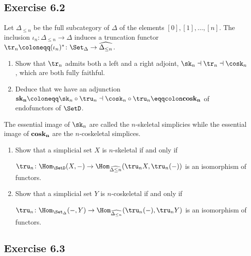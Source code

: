 \subsection{ Exercise 6.2 }

Let $ \Delta_{ \leq n } $ be the full subcategory of $ \Delta $ of the elements $ [ 0 ] , [ 1 ] , \dotsc , [ n ] $.
The inclusion $ \iota_n \colon \Delta_ { \leq n } \to \Delta $ induces a truncation functor $ \tr_n \coloneqq ( \iota_n )^* \colon \Set_{ \Delta } \to \widehat{ \Delta_ { \leq n } } $.

\begin{enumerate}[label=(\alph*)]
    
    \item 
    Show that $ \tr_n $ admits both a left and a right adjoint, $ \sk_n \dashv \tr_n \dashv \cosk_n $, which are both fully faithful.

    \item 
    Deduce that we have an adjunction $ \bold{sk_n} \coloneqq \sk_n \circ \tru_n \dashv \cosk_n \circ\tru_n \eqqcolon \bold{ cosk_n } $ of endofunctors of $ \SetD $.
    
\end{enumerate}

The essential image of $ \sk_n $ are called the $ n $-skeletal simplicies while the essential image of $ \bold { cosk_n } $ are the $ n $-coskeletal simplices.

\begin{enumerate}[label=(\alph*), resume]
    \item 
    Show that a simplicial set $ X $ is $ n $-skeletal if and only if 
    
    $ \tru_n \colon \Hom_{ \SetD } ( X , - ) \to \Hom_{ \widehat{ \Delta{ \leq n }}} ( \tru_n X , \tru_n ( - ) ) $ is an isomorphism of functors.

    \item 
    Show that a simplicial set $ Y $ is $ n $-coskeletal if and only if
    
    $ \tru_n \colon \Hom_{ \Set_\Delta } ( - , Y ) \to \Hom_{ \widehat{ \Delta_{ \leq n }} } ( \tru_n ( - ) , \tru_n Y ) $ is an isomorphism of functors.
\end{enumerate}

\subsection{ Exercise 6.3 }

